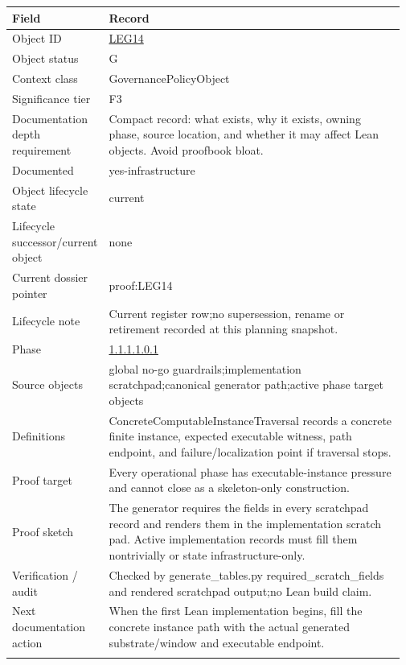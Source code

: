 \begin{longtable}{L{0.16\linewidth} L{0.81\linewidth}}
\hline
\textbf{Field} & \textbf{Record}\\
\hline
Object ID & \hyperlink{object-row-LEG14}{LEG14}\\
\hline\addlinespace[0.20em]
Object status & G\\
\hline\addlinespace[0.20em]
Context class & GovernancePolicyObject\\
\hline\addlinespace[0.20em]
Significance tier & F3\\
\hline\addlinespace[0.20em]
Documentation depth requirement & Compact record: what exists, why it exists, owning phase, source location, and whether it may affect Lean objects. Avoid proofbook bloat.\\
\hline\addlinespace[0.20em]
Documented & yes-infrastructure\\
\hline\addlinespace[0.20em]
Object lifecycle state & current\\
\hline\addlinespace[0.20em]
Lifecycle successor/\allowbreak{}current object & none\\
\hline\addlinespace[0.20em]
Current dossier pointer & proof:LEG14\\
\hline\addlinespace[0.20em]
Lifecycle note & Current register row;\newline no supersession, rename or retirement recorded at this planning snapshot.\\
\hline\addlinespace[0.20em]
Phase & \hyperlink{phase-row-1-1-1-1-0-1}{1.1.1.1.0.1}\\
\hline\addlinespace[0.20em]
Source objects & global no-go guardrails;\newline implementation scratchpad;\newline canonical generator path;\newline active phase target objects\\
\hline\addlinespace[0.20em]
Definitions & ConcreteComputableInstanceTraversal records a concrete finite instance, expected executable witness, path endpoint, and failure/\allowbreak{}localization point if traversal stops.\\
\hline\addlinespace[0.20em]
Proof target & Every operational phase has executable-instance pressure and cannot close as a skeleton-only construction.\\
\hline\addlinespace[0.20em]
Proof sketch & The generator requires the fields in every scratchpad record and renders them in the implementation scratch pad. Active implementation records must fill them nontrivially or state infrastructure-only.\\
\hline\addlinespace[0.20em]
Verification /\allowbreak{} audit & Checked by generate\_tables.py required\_scratch\_fields and rendered scratchpad output;\newline no Lean build claim.\\
\hline\addlinespace[0.20em]
Next documentation action & When the first Lean implementation begins, fill the concrete instance path with the actual generated substrate/\allowbreak{}window and executable endpoint.\\
\hline\addlinespace[0.20em]
\end{longtable}
